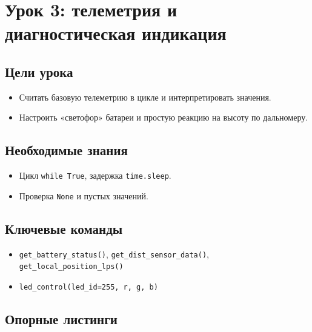 \section{Урок 3: телеметрия и диагностическая индикация}

\subsection{Цели урока}
\begin{itemize}
\item Считать базовую телеметрию в цикле и интерпретировать значения.
\item Настроить «светофор» батареи и простую реакцию на высоту по дальномеру.
\end{itemize}

\subsection{Необходимые знания}
\begin{itemize}
\item Цикл \texttt{while True}, задержка \texttt{time.sleep}.
\item Проверка \texttt{None} и пустых значений.
\end{itemize}

\subsection{Ключевые команды}
\begin{itemize}
\item \texttt{get\_battery\_status()}, \texttt{get\_dist\_sensor\_data()}, \texttt{get\_local\_position\_lps()}
\item \texttt{led\_control(led\_id=255, r, g, b)}
\end{itemize}

\subsection{Опорные листинги}





